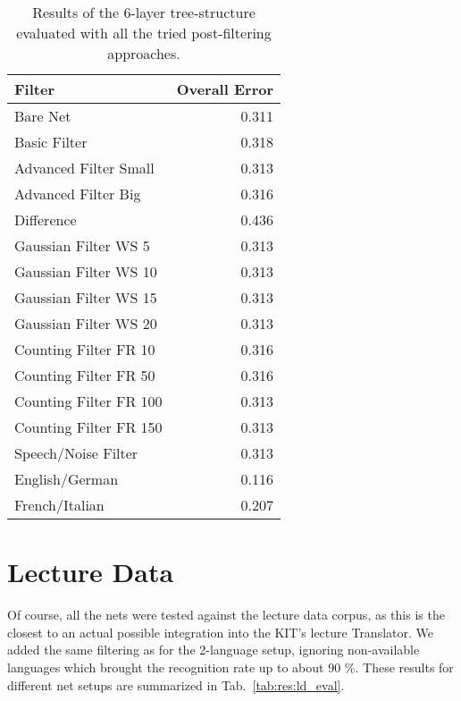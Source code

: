 \begin{table}[h!]
\label{tab:evalTotal}
\centering
\begin{tabular}{| l | r |}
	\hline
	\textbf{Filter} & \textbf{Overall Error}  \\
	\hline
	 Bare Net & 0.311 \\
	\hline
	Basic Filter &  0.318\\
	\hline
	Advanced Filter Small & 0.313 \\
	\hline
	Advanced Filter Big & 0.316\\
	\hline
	Difference & 0.436 \\
	\hline
	Gaussian Filter WS 5 & 0.313 \\
	\hline
	Gaussian Filter WS 10 & 0.313 \\
	\hline
	Gaussian Filter WS 15 & 0.313 \\
	\hline
	Gaussian Filter WS 20 & 0.313\\
	\hline
	Counting Filter FR 10 & 0.316 \\
	\hline
	Counting Filter FR 50 & 0.316 \\
	\hline
	Counting Filter FR 100 & 0.313\\
	\hline
	Counting Filter FR 150 & 0.313\\
	\hline
	Speech/Noise Filter  & 0.313 \\
	\hline
	English/German &  0.116 \\
	\hline
	French/Italian & 0.207\\
	\hline
\end{tabular}
\caption{Results of the 6-layer tree-structure evaluated with all the tried post-filtering approaches.}
\end{table}


\section{Lecture Data}
\label{sec:eval:ld}
Of course, all the nets were tested against the lecture data corpus, as this is the closest to an actual possible integration into the KIT's lecture Translator. We added the same filtering as for the 2-language setup, ignoring non-available languages which brought the recognition rate up to about 90 \%. These results for different net setups are summarized in Tab.~\ref{tab:res:ld_eval}. 

	